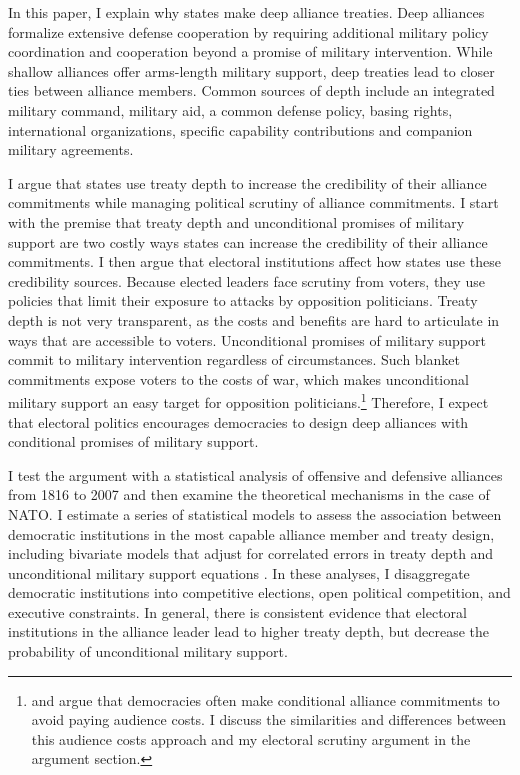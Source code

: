 \documentclass[12pt]{article}
\begin{document}
In this paper, I explain why states make deep alliance treaties. 
Deep alliances formalize extensive defense cooperation by requiring additional military policy coordination and cooperation beyond a promise of military intervention. 
While shallow alliances offer arms-length military support, deep treaties lead to closer ties between alliance members. 
Common sources of depth include an integrated military command, military aid, a common defense policy, basing rights, international organizations, specific capability contributions and companion military agreements. 


I argue that states use treaty depth to increase the credibility of their alliance commitments while managing political scrutiny of alliance commitments.
I start with the premise that treaty depth and unconditional promises of military support are two costly ways states can increase the credibility of their alliance commitments.
I then argue that electoral institutions affect how states use these credibility sources.
Because elected leaders face scrutiny from voters, they use policies that limit their exposure to attacks by opposition politicians.
Treaty depth is not very transparent, as the costs and benefits are hard to articulate in ways that are accessible to voters. 
Unconditional promises of military support commit to military intervention regardless of circumstances.  
Such blanket commitments expose voters to the costs of war, which makes unconditional military support an easy target for opposition politicians.\footnote{\citet{Mattes2012} \citet{Chibaetal2015} and \citet{FjelstulReiter2019} argue that democracies often make conditional alliance commitments to avoid paying audience costs. I discuss the similarities and differences between this audience costs approach and my electoral scrutiny argument in the argument section.} 
Therefore, I expect that electoral politics encourages democracies to design deep alliances with conditional promises of military support. 


I test the argument with a statistical analysis of offensive and defensive alliances from 1816 to 2007 and then examine the theoretical mechanisms in the case of NATO.
I estimate a series of statistical models to assess the association between democratic institutions in the most capable alliance member and treaty design, including bivariate models that adjust for correlated errors in treaty depth and unconditional military support equations \citep{Braumoelleretal2018}. 
In these analyses, I disaggregate democratic institutions into competitive elections, open political competition, and executive constraints.
In general, there is consistent evidence that electoral institutions in the alliance leader lead to higher treaty depth, but decrease the probability of unconditional military support. 
\end{document}

